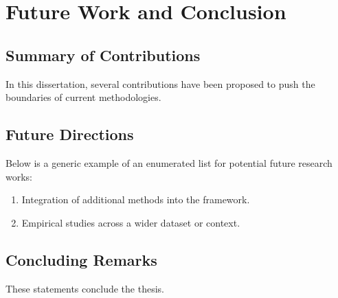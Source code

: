 \chapter{Future Work and Conclusion}
\label{chap:conclusion}

\section{Summary of Contributions}
In this dissertation, several contributions have been proposed to push the boundaries of current methodologies. 

\section{Future Directions}
Below is a generic example of an enumerated list for potential future research works:

\begin{enumerate}
    \item Integration of additional methods into the framework.
    \item Empirical studies across a wider dataset or context.
\end{enumerate}

\section{Concluding Remarks}
These statements conclude the thesis.
